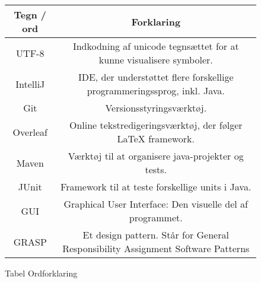 \begin{flushleft}
\begin{figure}[htp]
    \centering
\begin{tabular}{ | c | c | } 
\hline
Tegn / ord & Forklaring \\ 
\hline
UTF-8 & Indkodning af unicode tegnsættet for at kunne visualisere symboler. \\ 
\hline
IntelliJ & IDE, der understøttet flere forskellige programmeringssprog, inkl. Java. \\ 
\hline
Git & Versionsstyringsværktøj. \\ 
\hline
Overleaf & Online tekstredigeringsværktøj, der følger LaTeX framework. \\ 
\hline
Maven & Værktøj til at organisere java-projekter og tests. \\ 
\hline
JUnit & Framework til at teste forskellige units i Java. \\ 
\hline
GUI & Graphical User Interface: Den visuelle del af programmet. \\ 
\hline
GRASP & Et design pattern. Står for General Responsibility Assignment Software Patterns \\
\hline
 
\hline
\end{tabular}
\caption{Tabel Ordforklaring}
\end{figure}

\end{flushleft}